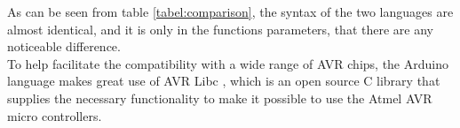As can be seen from table \ref{tabel:comparison}, the syntax of the two languages are almost identical, and it is only in the functions parameters, that there are any noticeable difference.\\ 
To help facilitate the compatibility with a wide range of AVR chips, the Arduino language makes great use of AVR Libc \cite{AVR:lib}, which is an open source C library that supplies the necessary functionality to make it possible to use the Atmel AVR micro controllers.